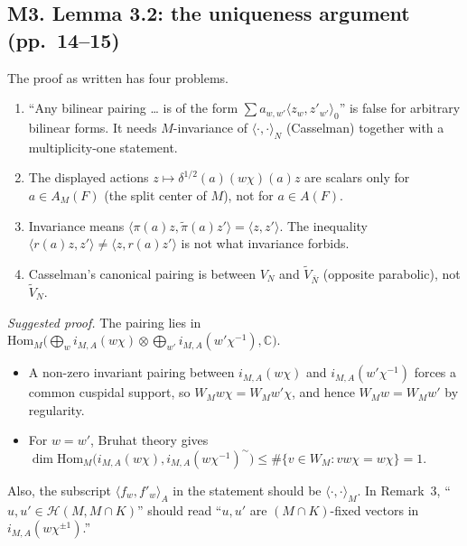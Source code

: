 \documentclass[11pt]{article}
\newcommand{\ip}[1]{\langle #1\rangle}
\begin{document}
\subsection*{M3. Lemma 3.2: the uniqueness argument (pp.~14--15)}
The proof as written has four problems.
\begin{enumerate}[label=(\roman*)]
\item ``Any bilinear pairing \dots{} is of the form $\sum a_{w,w'}\ip{z_w,z'_{w'}}_0$'' is false for arbitrary bilinear forms. It needs $M$-invariance of $\ip{\cdot,\cdot}_N$ (Casselman) together with a multiplicity-one statement.
\item The displayed actions $z\mapsto\delta^{1/2}(a)(w\chi)(a)z$ are scalars only for $a\in A_M(F)$ (the split center of $M$), not for $a\in A(F)$.
\item Invariance means $\ip{\pi(a)z,\tilde\pi(a)z'}=\ip{z,z'}$. The inequality $\ip{r(a)z,z'}\neq\ip{z,r(a)z'}$ is not what invariance forbids.
\item Casselman's canonical pairing is between $V_N$ and $\tilde V_{\bar N}$ (opposite parabolic), not $\tilde V_N$.
\end{enumerate}
\emph{Suggested proof.} The pairing lies in $\mathrm{Hom}_M\big(\bigoplus_w i_{M,A}(w\chi)\otimes\bigoplus_{w'} i_{M,A}(w'\chi^{-1}),\mathbb{C}\big)$.
\begin{itemize}
\item A non-zero invariant pairing between $i_{M,A}(w\chi)$ and $i_{M,A}(w'\chi^{-1})$ forces a common cuspidal support, so $W_Mw\chi=W_Mw'\chi$, and hence $W_Mw=W_Mw'$ by regularity.
\item For $w=w'$, Bruhat theory gives $\dim\mathrm{Hom}_M\big(i_{M,A}(w\chi),i_{M,A}(w\chi^{-1})^\sim\big)\le\#\{v\in W_M:vw\chi=w\chi\}=1$.
\end{itemize}
Also, the subscript $\ip{f_w,f'_w}_A$ in the statement should be $\ip{\cdot,\cdot}_M$. In Remark~3, ``$u,u'\in\mathcal{H}(M,M\cap K)$'' should read ``$u,u'$ are $(M\cap K)$-fixed vectors in $i_{M,A}(w\chi^{\pm1})$.''
\end{document}
